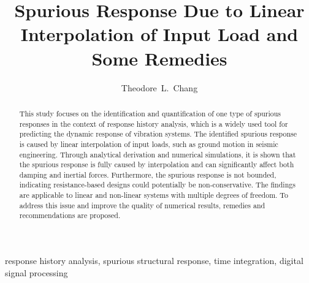 \documentclass[3p,sort&compress,11pt,fleqn,review]{elsarticle}
\begin{document}
\linenumbers
\begin{abstract}
\begin{linenumbers}
This study focuses on the identification and quantification of one type of spurious responses in the context of response history analysis, which is a widely used tool for predicting the dynamic response of vibration systems. The identified spurious response is caused by linear interpolation of input loads, such as ground motion in seismic engineering. Through analytical derivation and numerical simulations, it is shown that the spurious response is fully caused by interpolation and can significantly affect both damping and inertial forces. Furthermore, the spurious response is not bounded, indicating resistance-based designs could potentially be non-conservative. The findings are applicable to linear and non-linear systems with multiple degrees of freedom. To address this issue and improve the quality of numerical results, remedies and recommendations are proposed.
\end{linenumbers}
\end{abstract}
\begin{keyword}
response history analysis\sep
spurious structural response\sep
time integration\sep
digital signal processing
\end{keyword}
\begin{frontmatter}
\title{Spurious Response Due to Linear Interpolation of Input Load and Some Remedies}
\author[add1]{Theodore~L.~Chang}
\address[add1]{IRIS Adlershof, Humboldt-Universität zu Berlin, Berlin, Germany, 12489.}
\end{frontmatter}




\end{document}
